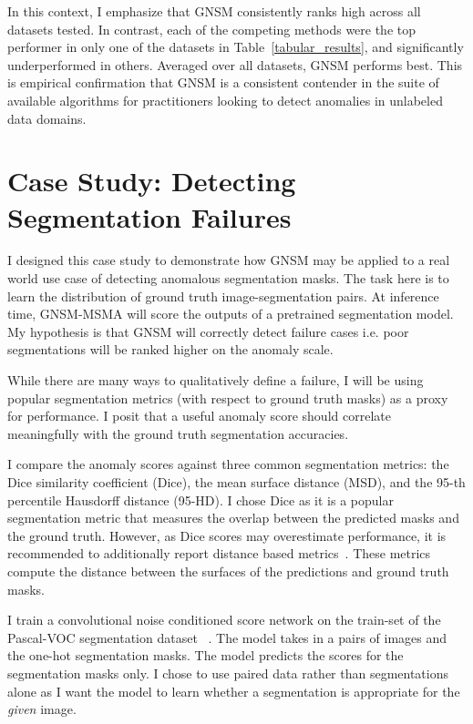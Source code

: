 In this context, I emphasize that GNSM consistently ranks high across all datasets tested. In contrast, each of the competing methods were the top performer in only one of the datasets in Table~\ref{tabular_results}, and significantly underperformed in others. Averaged over all datasets, GNSM performs best. This is empirical confirmation that GNSM is a consistent contender in the suite of available algorithms for practitioners looking to detect anomalies in unlabeled data domains.

\section{Case Study: Detecting Segmentation Failures}
\label{sec:cat-seg-study}
I designed this case study to demonstrate how GNSM may be applied to a real world use case of detecting anomalous segmentation masks.
The task here is to learn the distribution of ground truth image-segmentation pairs. At inference time, GNSM-MSMA will score the outputs of a pretrained segmentation model. My hypothesis is that GNSM will correctly detect failure cases i.e. poor segmentations will be ranked higher on the anomaly scale.

While there are many ways to qualitatively define a failure, I will be using popular segmentation metrics (with respect to ground truth masks) as a proxy for performance. I posit that a useful anomaly score should correlate meaningfully with the ground truth segmentation accuracies. 

I compare the anomaly scores against three common segmentation metrics: the Dice similarity coefficient (Dice), the mean surface distance (MSD), and the 95-th percentile Hausdorff distance (95-HD). I chose Dice as it is a popular segmentation metric that measures the overlap between the predicted masks and the ground truth. However, as Dice scores may overestimate performance, it is recommended to additionally report distance based metrics~\cite{valentini2014recommendations, taha2015metrics}. These metrics compute the distance between the surfaces of the predictions and ground truth masks.

I train a convolutional noise conditioned score network on the train-set of the Pascal-VOC segmentation dataset ~\cite{Everingham10}. The model takes in a pairs of images and the one-hot segmentation masks. The model predicts the scores for the segmentation masks only. I chose to use paired data rather than segmentations alone as I want the model to learn whether a segmentation is appropriate for the \textit{given} image. 

